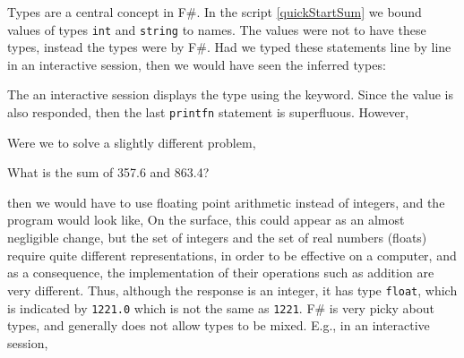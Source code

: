Types are a central concept in F\#. In the script \ref{quickStartSum} we bound values of types \lstinline|int| and \lstinline|string| to names. The values were not  to have these types, instead the types were  by F\#. Had we typed these statements line by line in an interactive session, then we would have seen the inferred types:
%
\begin{comment}
$ fsharpi

F# Interactive for F# 4.0 (Open Source Edition)
Freely distributed under the Apache 2.0 Open Source License

For help type #help;;

\end{comment}
%
%
\begin{comment}
  $
\end{comment}
%
%






%
%
\begin{comment}

> #quit;;
\end{comment}
%
 The an interactive session displays the type using the  keyword. Since the value is also responded, then the last \lstinline|printfn| statement is superfluous. However, 

Were we to solve a slightly different problem,
%
\begin{problem}
  What is the sum of 357.6 and 863.4?
\end{problem}
%
then we would have to use floating point arithmetic instead of integers, and the program would look like,
%
%
On the surface, this could appear as an almost negligible change, but the set of integers and the set of real numbers (floats) require quite different representations, in order to be effective on a computer, and as a consequence, the implementation of their operations such as addition are very different. Thus, although the response is an integer, it has type \lstinline|float|, which is indicated by \lstinline|1221.0| which is not the same as \lstinline|1221|. F\# is very picky about types, and generally does not allow types to be mixed. E.g., in an interactive session,
%

